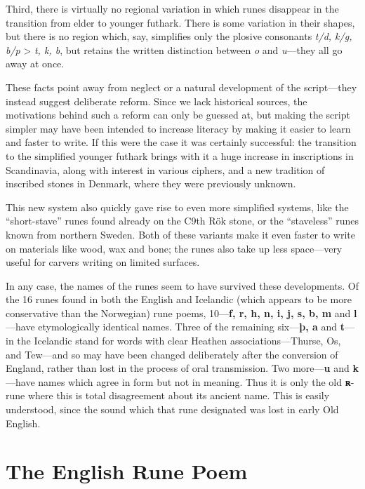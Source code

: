Third, there is virtually no regional variation in which runes disappear in the transition from elder to younger futhark.  There is some variation in their shapes, but there is no region which, say, simplifies only the plosive consonants \emph{t/d, k/g, b/p} > \emph{t, k, b}, but retains the written distinction between \emph{o} and \emph{u}—they all go away at once.

These facts point away from neglect or a natural development of the script—they instead suggest deliberate reform.  Since we lack historical sources, the motivations behind such a reform can only be guessed at, but making the script simpler may have been intended to increase literacy by making it easier to learn and faster to write.  If this were the case it was certainly successful: the transition to the simplified younger futhark brings with it a huge increase in inscriptions in Scandinavia, along with interest in various ciphers, and a new tradition of inscribed stones in Denmark, where they were previously unknown.

This new system also quickly gave rise to even more simplified systems, like the “short-stave” runes found already on the C9th Rök stone, or the “staveless” runes known from northern Sweden.  Both of these variants make it even faster to write on materials like wood, wax and bone; the runes also take up less space—very useful for carvers writing on limited surfaces.

In any case, the names of the runes seem to have survived these developments.  Of the 16 runes found in both the English and Icelandic (which appears to be more conservative than the Norwegian) rune poems, 10—\textbf{f, r, h, n, i, j, s, b, m} and \textbf{l}—have etymologically identical names.  Three of the remaining six—\textbf{þ, a} and \textbf{t}—in the Icelandic stand for words with clear Heathen associations—Thurse, Os, and Tew—and so may have been changed deliberately after the conversion of England, rather than lost in the process of oral transmission.  Two more—\textbf{u} and \textbf{k}—have names which agree in form but not in meaning.  Thus it is only the old \textbf{ʀ}-rune where this is total disagreement about its ancient name.  This is easily understood, since the sound which that rune designated was lost in early Old English.

\section{The English Rune Poem}

